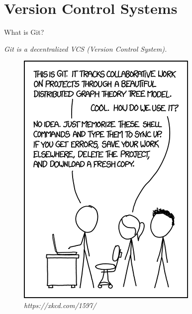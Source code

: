 \section{Version Control Systems}

\begin{frame}[fragile]{What is Git?}

    \emph{Git is a decentralized VCS (Version Control System).}

    \begin{figure}
        \centering
        \includegraphics[height=0.6\textheight]{img/xkcdgit.png}
        \caption{\textit{https://xkcd.com/1597/}}
    \end{figure}

\end{frame}

